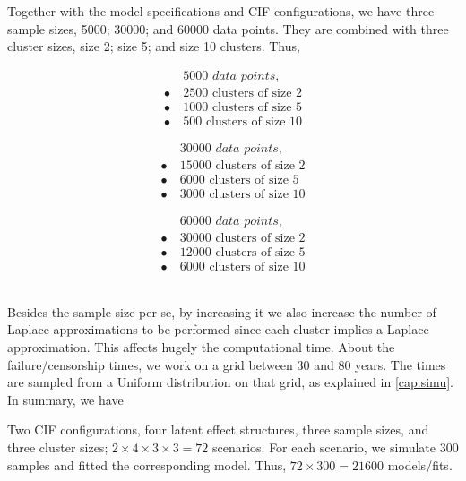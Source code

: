 Together with the model specifications and CIF configurations, we have
three sample sizes, 5000; 30000; and 60000 data points. They are
combined with three cluster sizes, size 2; size 5; and size 10
clusters. Thus,
\begin{minipage}{\textwidth/3}
 \begin{align*}
          &\textit{5000 data points},\\
  \bullet~&\text{2500 clusters of size 2}\\
  \bullet~&\text{1000 clusters of size 5}\\
  \bullet~&\text{500 clusters of size 10}
 \end{align*}
\end{minipage}%
\begin{minipage}{\textwidth/3}
 \begin{align*}
          &\textit{30000 data points},\\
  \bullet~&\text{15000 clusters of size 2}\\
  \bullet~&\text{6000 clusters of size 5}\\
  \bullet~&\text{3000 clusters of size 10}
 \end{align*}
\end{minipage}%
\begin{minipage}{\textwidth/3}
 \begin{align*}
          &\textit{60000 data points},\\
  \bullet~&\text{30000 clusters of size 2}\\
  \bullet~&\text{12000 clusters of size 5}\\
  \bullet~&\text{6000 clusters of size 10}
 \end{align*}
\end{minipage}\\

Besides the sample size per se, by increasing it we also increase the
number of Laplace approximations to be performed since each cluster
implies a Laplace approximation. This affects hugely the computational
time. About the failure/censorship times, we work on a grid between 30
and 80 years. The times are sampled from a Uniform distribution on that
grid, as explained in \autoref{cap:simu}. In summary, we have

Two CIF configurations, four latent effect structures, three sample
sizes, and three cluster sizes; \(2 \times 4 \times 3 \times 3 = 72\)
scenarios. For each scenario, we simulate 300 samples and fitted the
corresponding model. Thus, \(72 \times 300 = 21600\) models/fits.

